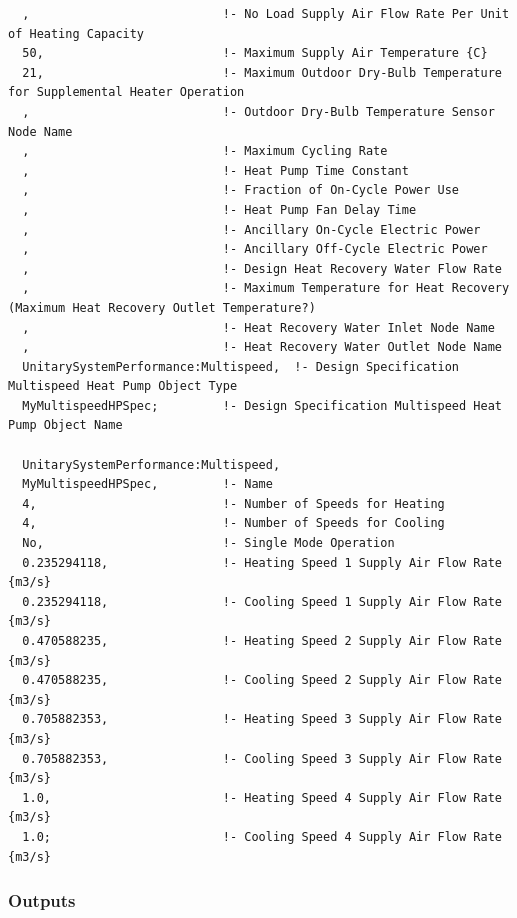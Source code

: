 \begin{lstlisting}
  ,                           !- No Load Supply Air Flow Rate Per Unit of Heating Capacity
  50,                         !- Maximum Supply Air Temperature {C}
  21,                         !- Maximum Outdoor Dry-Bulb Temperature for Supplemental Heater Operation
  ,                           !- Outdoor Dry-Bulb Temperature Sensor Node Name
  ,                           !- Maximum Cycling Rate
  ,                           !- Heat Pump Time Constant
  ,                           !- Fraction of On-Cycle Power Use
  ,                           !- Heat Pump Fan Delay Time
  ,                           !- Ancillary On-Cycle Electric Power
  ,                           !- Ancillary Off-Cycle Electric Power
  ,                           !- Design Heat Recovery Water Flow Rate
  ,                           !- Maximum Temperature for Heat Recovery (Maximum Heat Recovery Outlet Temperature?)
  ,                           !- Heat Recovery Water Inlet Node Name
  ,                           !- Heat Recovery Water Outlet Node Name
  UnitarySystemPerformance:Multispeed,  !- Design Specification Multispeed Heat Pump Object Type
  MyMultispeedHPSpec;         !- Design Specification Multispeed Heat Pump Object Name

  UnitarySystemPerformance:Multispeed,
  MyMultispeedHPSpec,         !- Name
  4,                          !- Number of Speeds for Heating
  4,                          !- Number of Speeds for Cooling
  No,                         !- Single Mode Operation
  0.235294118,                !- Heating Speed 1 Supply Air Flow Rate {m3/s}
  0.235294118,                !- Cooling Speed 1 Supply Air Flow Rate {m3/s}
  0.470588235,                !- Heating Speed 2 Supply Air Flow Rate {m3/s}
  0.470588235,                !- Cooling Speed 2 Supply Air Flow Rate {m3/s}
  0.705882353,                !- Heating Speed 3 Supply Air Flow Rate {m3/s}
  0.705882353,                !- Cooling Speed 3 Supply Air Flow Rate {m3/s}
  1.0,                        !- Heating Speed 4 Supply Air Flow Rate {m3/s}
  1.0;                        !- Cooling Speed 4 Supply Air Flow Rate {m3/s}
\end{lstlisting}

\subsubsection{Outputs}\label{outputs-038}

